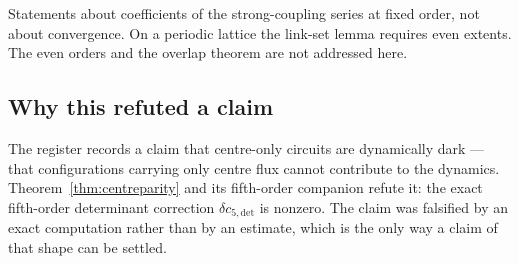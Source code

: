 \begin{scopenote}
Statements about coefficients of the strong-coupling series at fixed
order, not about convergence. On a periodic lattice the link-set lemma
requires even extents. The even orders and the overlap theorem are not
addressed here.
\end{scopenote}

\subsection{Why this refuted a claim}

The register records a claim that centre-only circuits are dynamically
dark --- that configurations carrying only centre flux cannot contribute
to the dynamics. Theorem~\ref{thm:centreparity} and its fifth-order
companion refute it: the exact fifth-order determinant correction
$\delta c_{5,\mathrm{det}}$ is nonzero. The claim was falsified by an
exact computation rather than by an estimate, which is the only way a
claim of that shape can be settled.
